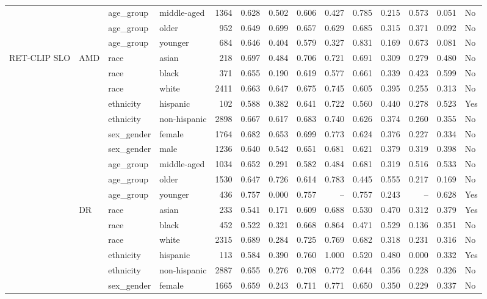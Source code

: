 \begin{longtable}{@{}lll l rrrrrrrr@{}}
 &  & age\_group & middle-aged & 1364 & 0.628 & 0.502 & 0.606 & 0.427 & 0.785 & 0.215 & 0.573 & 0.051 & No \\
 &  & age\_group & older & 952 & 0.649 & 0.699 & 0.657 & 0.629 & 0.685 & 0.315 & 0.371 & 0.092 & No \\
 &  & age\_group & younger & 684 & 0.646 & 0.404 & 0.579 & 0.327 & 0.831 & 0.169 & 0.673 & 0.081 & No \\
RET-CLIP SLO & AMD & race & asian & 218 & 0.697 & 0.484 & 0.706 & 0.721 & 0.691 & 0.309 & 0.279 & 0.480 & No \\
 &  & race & black & 371 & 0.655 & 0.190 & 0.619 & 0.577 & 0.661 & 0.339 & 0.423 & 0.599 & No \\
 &  & race & white & 2411 & 0.663 & 0.647 & 0.675 & 0.745 & 0.605 & 0.395 & 0.255 & 0.313 & No \\
 &  & ethnicity & hispanic & 102 & 0.588 & 0.382 & 0.641 & 0.722 & 0.560 & 0.440 & 0.278 & 0.523 & Yes \\
 &  & ethnicity & non-hispanic & 2898 & 0.667 & 0.617 & 0.683 & 0.740 & 0.626 & 0.374 & 0.260 & 0.355 & No \\
 &  & sex\_gender & female & 1764 & 0.682 & 0.653 & 0.699 & 0.773 & 0.624 & 0.376 & 0.227 & 0.334 & No \\
 &  & sex\_gender & male & 1236 & 0.640 & 0.542 & 0.651 & 0.681 & 0.621 & 0.379 & 0.319 & 0.398 & No \\
 &  & age\_group & middle-aged & 1034 & 0.652 & 0.291 & 0.582 & 0.484 & 0.681 & 0.319 & 0.516 & 0.533 & No \\
 &  & age\_group & older & 1530 & 0.647 & 0.726 & 0.614 & 0.783 & 0.445 & 0.555 & 0.217 & 0.169 & No \\
 &  & age\_group & younger & 436 & 0.757 & 0.000 & 0.757 & -- & 0.757 & 0.243 & -- & 0.628 & Yes \\
 & DR & race & asian & 233 & 0.541 & 0.171 & 0.609 & 0.688 & 0.530 & 0.470 & 0.312 & 0.379 & Yes \\
 &  & race & black & 452 & 0.522 & 0.321 & 0.668 & 0.864 & 0.471 & 0.529 & 0.136 & 0.351 & No \\
 &  & race & white & 2315 & 0.689 & 0.284 & 0.725 & 0.769 & 0.682 & 0.318 & 0.231 & 0.316 & No \\
 &  & ethnicity & hispanic & 113 & 0.584 & 0.390 & 0.760 & 1.000 & 0.520 & 0.480 & 0.000 & 0.332 & Yes \\
 &  & ethnicity & non-hispanic & 2887 & 0.655 & 0.276 & 0.708 & 0.772 & 0.644 & 0.356 & 0.228 & 0.326 & No \\
 &  & sex\_gender & female & 1665 & 0.659 & 0.243 & 0.711 & 0.771 & 0.650 & 0.350 & 0.229 & 0.337 & No \\

\end{longtable}
